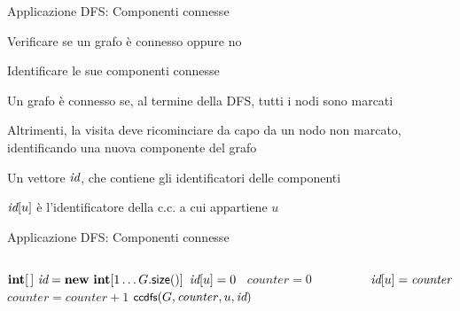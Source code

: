 \begin{frame}{Applicazione DFS: Componenti connesse}

\vspace{-6pt}
\begin{myboxtitle}[Problema]
\BI
\item Verificare se un grafo è connesso oppure no
\item Identificare le sue componenti connesse
\EI
\end{myboxtitle}

\pause
\begin{myboxtitle}[Soluzione]
\BI
\item Un grafo è connesso se, al termine della DFS, tutti i nodi sono marcati
\item Altrimenti, la visita deve ricominciare da capo da un nodo non marcato, identificando una nuova componente del grafo
\EI
\end{myboxtitle}

\begin{myboxtitle}
\BI
\item Un vettore $\textit{id}$, che contiene gli identificatori delle componenti
\item $\textit{id}[u]$ è l'identificatore della c.c. a cui appartiene $u$
\EI
\end{myboxtitle}

\end{frame}


\begin{frame}{Applicazione DFS: Componenti connesse}

\vspace{-12pt}
\begin{columns}[T]
\begin{Procedure}
\caption[A]{$\INTEGER[\,]$ \connectedcomponents(\Graph $G$)}
$\INTEGER[\,]\ \components = \NEW\ \INTEGER[1 \mldots G.\textsf{size}()]$\;
{
  $\textit{id}[u] = 0$
}
\INTEGER\ $\mathit{counter} = 0$\;
{
  {
    $\mathit{counter} = \mathit{counter}+1$\;
    $\textsf{{\small ccdfs}}(G, \mathit{counter}, u, \textit{id})$\;
  }
}
\Return \components\;
\end{Procedure}
\begin{Procedure}
\caption[A]{\ccdfs(\Graph $G$, \INTEGER\ $\mathit{counter}$, \Node\ $u$, $\INTEGER[\,]\ \components$)}
$\textit{id}[u] = \mathit{counter}$\;
{
}
\end{Procedure}
\end{columns}
\end{frame}



